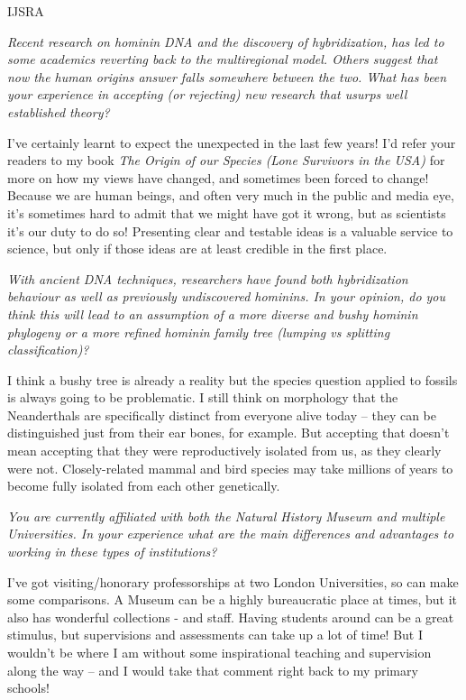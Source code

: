 \documentclass{ijsra}
\begin{document}
\begin{labeling}{IJSRA}
\item[IJSRA]
\emph{Recent research on hominin DNA and the discovery of hybridization, has led to some academics reverting back to
the multiregional model. 
Others suggest that now the human origins answer falls somewhere between the two.
What has been your experience in accepting (or rejecting) new research that usurps well established theory?}

\item[CS]
I’ve certainly learnt to expect the unexpected in the last few years!
I’d refer your readers to my book \emph{The Origin of our Species (Lone Survivors in the USA)} for more on how my views have changed,
and sometimes been forced to change!
Because we are human beings, and often very much in the public and media eye, it’s sometimes hard to
admit that we might have got it wrong, but as scientists it’s our duty to do so!
Presenting clear and testable ideas is a valuable service to science, but only if those ideas are at least credible in the first place.

\item[IJSRA]
\emph{With ancient DNA techniques, researchers have found both hybridization behaviour as well as
previously undiscovered hominins.
In your opinion, do you think this will lead to an assumption of a more diverse and bushy hominin phylogeny or
a more refined hominin family tree (lumping vs splitting classification)?}

\item[CS]
I think a bushy tree is already a reality but the species question applied to fossils is always going to be problematic.
I still think on morphology that the Neanderthals are specifically distinct from everyone alive today – they can be
distinguished just from their ear bones, for example.
But accepting that doesn’t mean accepting that they were reproductively isolated from us, as they clearly were not.
Closely-related mammal and bird species may take millions of years to become fully isolated from each other genetically.

\item[IJSRA]
\emph{You are currently affiliated with both the Natural History Museum and multiple Universities.
In your experience what are the main differences and advantages to working in these types of institutions?}

\item[CS]
I’ve got visiting/honorary professorships at two London Universities, so can make some comparisons.
A Museum can be a highly bureaucratic place at times, but it also has wonderful collections - and staff.
Having students around can be a great stimulus, but supervisions and assessments can take up a lot of time!
But I wouldn’t be where I am without some inspirational teaching and supervision along the way – and
I would take that comment right back to my primary schools!


\end{labeling}
\end{document}
